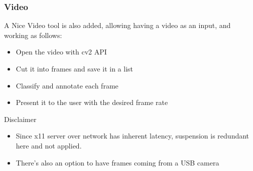\begin{frame}
    \frametitle{Video}
    A Nice Video tool is also added, allowing having a video as an input, and working as follows:
    \begin{itemize}
        \item Open the video with cv2 API
        \item Cut it into frames and save it in a list
        \item Classify and annotate each frame
        \item Present it to the user with the desired frame rate
    \end{itemize}
    \begin{block}{Disclaimer}
        \begin{itemize}
            \item Since x11 server over network has inherent latency, suspension is redundant here and not applied.
            \item There's also an option to have frames coming from a USB camera
        \end{itemize}
    \end{block}
\end{frame}
